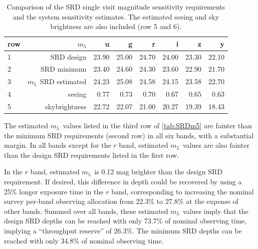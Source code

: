 \documentclass[PST,authoryear,toc]{lsstdoc}
\newcommand{\cm}{\ensuremath{C_m}}
\newcommand{\mf}{\ensuremath{m_5}}
\begin{document}
\begin{table}[ht!]
\caption{Comparison of the SRD single visit magnitude sensitivity requirements and the system sensitivity estimates. The %
 estimated seeing and sky brightness are also included (row 5 and 6).}\label{tab:SRDm5}
\footnotesize
\vskip 0.05in
\centering
\begin{tabular}{lrrrrrrr}
\hline    
row & {\mf} &       u &       g &       r &       i &       z &       y \\
\hline
1 & SRD design                 &  23.90 &  25.00 &  24.70 &  24.00 &  23.30 &  22.10 \\
2 & SRD minimum                &  23.40 &  24.60 &  24.30 &  23.60 &  22.90 &  21.70 \\
3 & \mf\ SRD estimated         &  24.23 &  25.08 &  24.58 &  24.15 &  23.58 &  22.70 \\
\hline
4 & seeing                     &   0.77 &   0.73 &   0.70 &   0.67 &   0.65 &   0.63 \\
5 & skybrightness              &  22.72 &  22.07 &  21.00 &  20.27 &  19.39 &  18.43 \\
\hline
\end{tabular}
\end{table}

\FloatBarrier

  
 
 
The estimated \mf\ values listed in the third row of \autoref{tab:SRDm5} are fainter
than the minimum SRD requirements (second row) in all six bands, with a substantial 
margin. In all bands except for the $r$ band, estimated \mf\ values are also fainter
than the design SRD requirements listed in the first row.  

In the $r$ band, estimated \mf\ is 0.12 mag brighter than the design SRD requirement.
If desired, this difference in depth could be recovered by using a 25\% longer exposure 
time in the $r$ band, corresponding to increasing the nominal survey per-band observing
allocation from 22.3\% to 27.8\% at the expense of other bands. Summed over 
all bands, these estimated \mf\ values imply that the design SRD depths can be
reached with only 73.7\% of nominal observing time, implying a ``throughput reserve''
of 26.3\%. The minimum SRD depths can be reached with only 34.8\% of nominal observing time.
\end{document}
